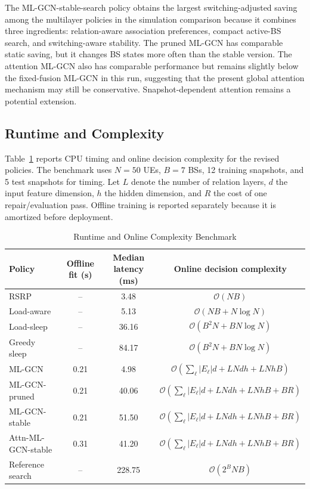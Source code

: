 \documentclass[journal]{IEEEtran}
\begin{document}
The ML-GCN-stable-search policy obtains the largest switching-adjusted saving
among the multilayer policies in the simulation comparison because it combines
three ingredients:
relation-aware association preferences, compact active-BS search, and
switching-aware stability. The pruned ML-GCN has comparable static
saving, but it changes BS states more often than the stable version. The
attention ML-GCN also has comparable performance but remains slightly below the
fixed-fusion ML-GCN in this run, suggesting that the present global attention
mechanism may still be conservative. Snapshot-dependent attention remains a potential
extension.

\subsection{Runtime and Complexity}
Table~\ref{tab:runtime_complexity} reports CPU timing and online decision
complexity for the revised policies. The benchmark uses $N=50$ UEs, $B=7$ BSs,
12 training snapshots, and 5 test snapshots for timing. Let $L$ denote the
number of relation layers, $d$ the input feature dimension, $h$ the hidden
dimension, and $R$ the cost of one repair/evaluation pass. Offline training is
reported separately because it is amortized before deployment.

\begin{table}[!t]
\caption{Runtime and Online Complexity Benchmark}
\label{tab:runtime_complexity}
\centering
\small
\begin{tabular}{lccc}
\toprule
Policy & Offline fit (s) & Median latency (ms) & Online decision complexity \\
\midrule
RSRP & -- & 3.48 & $\mathcal{O}(NB)$ \\
Load-aware & -- & 5.13 & $\mathcal{O}(NB+N\log N)$ \\
Load-sleep & -- & 36.16 & $\mathcal{O}(B^{2}N+B N\log N)$ \\
Greedy sleep & -- & 84.17 & $\mathcal{O}(B^{2}N+B N\log N)$ \\
ML-GCN & 0.21 & 4.98 & $\mathcal{O}(\sum_{\ell}|E_{\ell}|d+LNdh+LNhB)$ \\
ML-GCN-pruned & 0.21 & 40.06 & $\mathcal{O}(\sum_{\ell}|E_{\ell}|d+LNdh+LNhB+BR)$ \\
ML-GCN-stable & 0.21 & 51.50 & $\mathcal{O}(\sum_{\ell}|E_{\ell}|d+LNdh+LNhB+BR)$ \\
Attn-ML-GCN-stable & 0.31 & 41.20 & $\mathcal{O}(\sum_{\ell}|E_{\ell}|d+LNdh+LNhB+BR)$ \\
Reference search & -- & 228.75 & $\mathcal{O}(2^{B}NB)$ \\
\bottomrule
\end{tabular}
\end{table}
\end{document}
